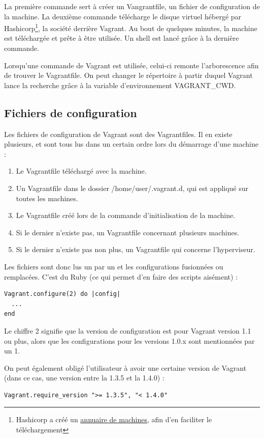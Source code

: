 \documentclass[12pt,a4paper]{article}
\begin{document}
La première commande sert à créer un Vangrantfile, un fichier de configuration de la machine. La deuxième commande télécharge le disque virtuel hébergé par Hashicorp\footnote{Hashicorp a créé un \href{https://atlas.hashicorp.com/boxes/search}{annuaire de machines}, afin d'en faciliter le téléchargement}, la société derrière Vagrant.
Au bout de quelques minutes, la machine est téléchargée et prête à être utilisée. Un shell est lancé grâce à la dernière commande. 

Lorsqu'une commande de Vagrant est utilisée, celui-ci remonte l'arborescence afin de trouver le Vagrantfile. On peut changer le répertoire à partir duquel Vagrant lance la recherche grâce à la variable d'environnement VAGRANT\_CWD. 

\subsection{Fichiers de configuration}
Les fichiers de configuration de Vagrant sont des Vagrantfiles. Il en existe plusieurs, et sont tous lus dans un certain ordre lors du démarrage d'une machine :
\begin{enumerate}
	\item{Le Vagrantfile téléchargé avec la machine.}
	\item{Un Vagrantfile dans le dossier /home/user/.vagrant.d, qui est appliqué sur toutes les machines.}
	\item{Le Vagrantfile créé lors de la commande d'initialisation de la machine.}
	\item{Si le dernier n'existe pas, un Vagrantfile concernant plusieurs machines.}
	\item{Si le dernier n'existe pas non plus, un Vagrantfile qui concerne l'hyperviseur.}
\end{enumerate}

Les fichiers sont donc lus un par un et les configurations fusionnées ou remplacées. C'est du Ruby (ce qui permet d'en faire des scripts aisément) :
\begin{lstlisting}
Vagrant.configure(2) do |config|
  ...
end
\end{lstlisting}
Le chiffre 2 signifie que la version de configuration est pour Vagrant version 1.1 ou plus, alors que les configurations pour les versions 1.0.x sont mentionnées par un 1.

On peut également obligé l'utilisateur à avoir une certaine version de Vagrant (dans ce cas, une version entre la 1.3.5 et la 1.4.0) :
\begin{lstlisting}
Vagrant.require_version ">= 1.3.5", "< 1.4.0"
\end{lstlisting}
\end{document}
